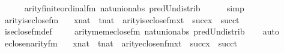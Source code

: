 \begin{isabellebody}
\ \ \ \ \isamarkupfalse%
\ arity{\isacharunderscore}{\kern0pt}finite{\isacharunderscore}{\kern0pt}ordinal{\isacharunderscore}{\kern0pt}fm\ nat{\isacharunderscore}{\kern0pt}union{\isacharunderscore}{\kern0pt}abs{}\ pred{\isacharunderscore}{\kern0pt}Un{\isacharunderscore}{\kern0pt}distrib\isanewline
\ \ \ \ \isamarkupfalse%
\ simp\isanewline
{}\isamarkupfalse%
%
\endisatagproof
{\isafoldproof}%
%
\isadelimproof
\isanewline
%
\endisadelimproof
\isanewline
{}\isamarkupfalse%
\ arity{\isacharunderscore}{\kern0pt}is{\isacharunderscore}{\kern0pt}eclose{\isacharunderscore}{\kern0pt}fm\ {\isacharcolon}{\kern0pt}\isanewline
\ \ {\isachardoublequoteopen}{\isasymlbrakk}x{\isasymin}nat\ {\isacharsemicolon}{\kern0pt}\ t{\isasymin}nat{\isasymrbrakk}\ {\isasymLongrightarrow}\ arity{\isacharparenleft}{\kern0pt}is{\isacharunderscore}{\kern0pt}eclose{\isacharunderscore}{\kern0pt}fm{\isacharparenleft}{\kern0pt}x{\isacharcomma}{\kern0pt}t{\isacharparenright}{\kern0pt}{\isacharparenright}{\kern0pt}\ {\isacharequal}{\kern0pt}\ succ{\isacharparenleft}{\kern0pt}x{\isacharparenright}{\kern0pt}\ {\isasymunion}\ succ{\isacharparenleft}{\kern0pt}t{\isacharparenright}{\kern0pt}{\isachardoublequoteclose}\isanewline
%
\isadelimproof
\ \ %
\endisadelimproof
%
\isatagproof
{}\isamarkupfalse%
\ is{\isacharunderscore}{\kern0pt}eclose{\isacharunderscore}{\kern0pt}fm{\isacharunderscore}{\kern0pt}def\ \isanewline
\ \ \isamarkupfalse%
\ arity{\isacharunderscore}{\kern0pt}mem{\isacharunderscore}{\kern0pt}eclose{\isacharunderscore}{\kern0pt}fm\ nat{\isacharunderscore}{\kern0pt}union{\isacharunderscore}{\kern0pt}abs{}\ pred{\isacharunderscore}{\kern0pt}Un{\isacharunderscore}{\kern0pt}distrib\isanewline
\ \ \isamarkupfalse%
\ auto%
\endisatagproof
{\isafoldproof}%
%
\isadelimproof
\isanewline
%
\endisadelimproof
\isanewline
{}\isamarkupfalse%
\ eclose{\isacharunderscore}{\kern0pt}n{}arity{\isacharunderscore}{\kern0pt}{\isacharunderscore}{\kern0pt}fm\ {\isacharcolon}{\kern0pt}\isanewline
\ \ {\isachardoublequoteopen}{\isasymlbrakk}x{\isasymin}nat\ {\isacharsemicolon}{\kern0pt}\ t{\isasymin}nat{\isasymrbrakk}\ {\isasymLongrightarrow}\ arity{\isacharparenleft}{\kern0pt}eclose{\isacharunderscore}{\kern0pt}n{}{\isacharunderscore}{\kern0pt}fm{\isacharparenleft}{\kern0pt}x{\isacharcomma}{\kern0pt}t{\isacharparenright}{\kern0pt}{\isacharparenright}{\kern0pt}\ {\isacharequal}{\kern0pt}\ succ{\isacharparenleft}{\kern0pt}x{\isacharparenright}{\kern0pt}\ {\isasymunion}\ succ{\isacharparenleft}{\kern0pt}t{\isacharparenright}{\kern0pt}{\isachardoublequoteclose}\isanewline

\end{isabellebody}
